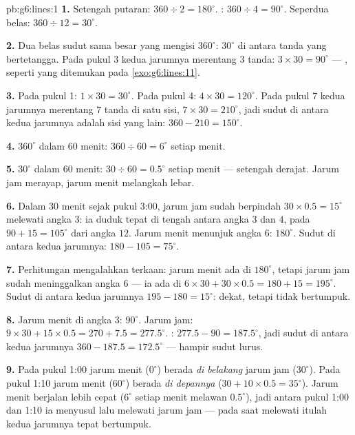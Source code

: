 \begin{solution}{pb:g6:lines:1}
\textbf{1.} Setengah putaran: $360 \div 2 = 180^\circ$. :
$360 \div 4 = 90^\circ$. Seperdua belas: $360 \div 12 = 30^\circ$.

\textbf{2.} Dua belas sudut sama besar yang mengisi $360^\circ$:
$30^\circ$ di antara tanda yang bertetangga. Pada pukul 3 kedua
jarumnya merentang $3$ tanda: $3 \times 30 = 90^\circ$ --- , seperti yang ditemukan pada \cref{exo:g6:lines:11}.

\textbf{3.} Pada pukul 1: $1 \times 30 = 30^\circ$. Pada pukul 4:
$4 \times 30 = 120^\circ$. Pada pukul 7 kedua jarumnya merentang $7$
tanda di satu sisi, $7 \times 30 = 210^\circ$, jadi sudut di antara
kedua jarumnya adalah sisi yang lain: $360 - 210 = 150^\circ$.

\textbf{4.} $360^\circ$ dalam $60$ menit: $360 \div 60 =
6^\circ$ setiap menit.

\textbf{5.} $30^\circ$ dalam $60$ menit: $30 \div 60 = 0.5^\circ$
setiap menit --- setengah derajat. Jarum jam merayap, jarum menit
melangkah lebar.

\textbf{6.} Dalam $30$ menit sejak pukul 3:00, jarum jam sudah
berpindah $30 \times 0.5 = 15^\circ$ melewati angka $3$: ia duduk
tepat di tengah antara angka $3$ dan $4$, pada $90 + 15 = 105^\circ$
dari angka $12$. Jarum menit menunjuk angka $6$: $180^\circ$. Sudut di
antara kedua jarumnya: $180 - 105 = 75^\circ$.

\textbf{7.} Perhitungan mengalahkan terkaan: jarum menit ada di
$180^\circ$, tetapi jarum jam sudah meninggalkan angka $6$ --- ia ada
di $6 \times 30 + 30 \times 0.5 = 180 + 15 = 195^\circ$. Sudut di
antara kedua jarumnya $195 - 180 = 15^\circ$: dekat, tetapi tidak
bertumpuk.

\textbf{8.} Jarum menit di angka $3$: $90^\circ$. Jarum jam:
$9 \times 30 + 15 \times 0.5 = 270 + 7.5 = 277.5^\circ$. :
$277.5 - 90 = 187.5^\circ$, jadi sudut di antara kedua jarumnya
$360 - 187.5 = 172.5^\circ$ --- hampir sudut lurus.

\textbf{9.} Pada pukul 1:00 jarum menit ($0^\circ$) berada
\emph{di belakang} jarum jam ($30^\circ$). Pada pukul 1:10 jarum
menit ($60^\circ$) berada \emph{di depannya}
($30 + 10 \times 0.5 = 35^\circ$). Jarum menit berjalan lebih cepat
($6^\circ$ setiap menit melawan $0.5^\circ$), jadi antara pukul 1:00
dan 1:10 ia menyusul lalu melewati jarum jam --- pada saat melewati
itulah kedua jarumnya tepat bertumpuk.


\end{solution}
